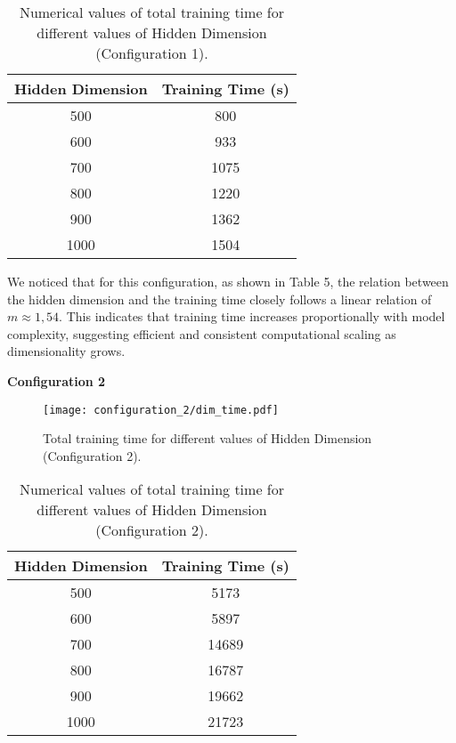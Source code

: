 
\begin{table}[h]
\centering
\caption{Numerical values of total training time for different values of Hidden Dimension (Configuration 1).}
\begin{tabular}{|c|c|}
\hline
Hidden Dimension & Training Time (s)\\
\hline
500  & 800\\
600  & 933\\
700  & 1075\\
800  & 1220\\
900  & 1362\\
1000  & 1504\\
\hline
\end{tabular}
\label{tab:time_hidden_dim_evolution_table_c1}
\end{table}

We noticed that for this configuration, as shown in Table 5, the relation between the hidden dimension and the training time closely follows a linear relation of $m \approx 1,54$. This indicates that training time increases proportionally with model complexity, suggesting efficient and consistent computational scaling as dimensionality grows.

\vspace{1.8cm}
\textbf{Configuration 2}

\begin{figure}[H]
    \centering
    \texttt{[image: configuration\_2/dim\_time.pdf]}
    \caption{Total training time for different values of Hidden Dimension (Configuration 2).}  
    \label{fig:time_hidden_dim_evolution_c2}               
\end{figure}


\begin{table}[h]
\centering
\caption{Numerical values of total training time for different values of Hidden Dimension (Configuration 2).}
\begin{tabular}{|c|c|}
\hline
Hidden Dimension & Training Time (s)\\
\hline
500  & 5173\\
600  & 5897\\
700  & 14689\\
800  & 16787\\
900  & 19662\\
1000  & 21723\\
\hline
\end{tabular}
\label{tab:time_hidden_dim_evolution_table_c2}
\end{table}

